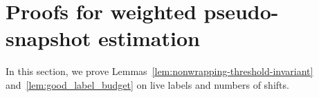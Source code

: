 \section{Proofs for weighted pseudo-snapshot estimation}
\label{app:quantum-estimation-proofs}

In this section, we prove Lemmas~\ref{lem:nonwrapping-threshold-invariant} and~\ref{lem:good_label_budget} on live labels and numbers of shifts.



